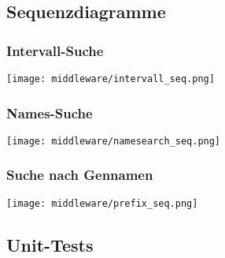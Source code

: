 \newpage
\subsection{Sequenzdiagramme}
\subsubsection{Intervall-Suche}
\texttt{[image: middleware/intervall\_seq.png]}
\subsubsection{Names-Suche}
\texttt{[image: middleware/namesearch\_seq.png]}
\subsubsection{Suche nach Gennamen}
\texttt{[image: middleware/prefix\_seq.png]}

\newpage
\subsection{Unit-Tests}
